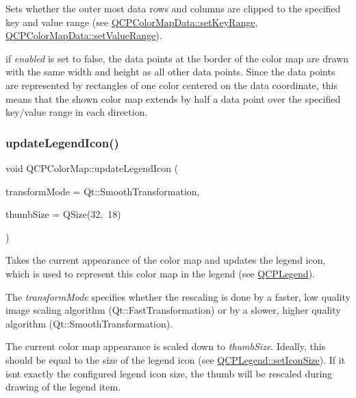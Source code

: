 Sets whether the outer most data rows and columns are clipped to the specified key and value range (see \hyperlink{class_q_c_p_color_map_data_a0738c485f3c9df9ea1241b7a8bb6a86e}{Q\+C\+P\+Color\+Map\+Data\+::set\+Key\+Range}, \hyperlink{class_q_c_p_color_map_data_ada1b2680ba96a5f4175b6d341cf75d23}{Q\+C\+P\+Color\+Map\+Data\+::set\+Value\+Range}).

if {\itshape enabled} is set to false, the data points at the border of the color map are drawn with the same width and height as all other data points. Since the data points are represented by rectangles of one color centered on the data coordinate, this means that the shown color map extends by half a data point over the specified key/value range in each direction.

\mbox{\label{class_q_c_p_color_map_a5d8158b62d55fcfeaabcb68ce0083e87}} 
\subsubsection{\texorpdfstring{update\+Legend\+Icon()}{updateLegendIcon()}}
{\footnotesize\ttfamily void Q\+C\+P\+Color\+Map\+::update\+Legend\+Icon (\begin{DoxyParamCaption}\item[{Qt\+::\+Transformation\+Mode}]{transform\+Mode = {\ttfamily Qt\+:\+:SmoothTransformation},  }\item[{const Q\+Size \&}]{thumb\+Size = {\ttfamily QSize(32,~18)} }\end{DoxyParamCaption})}

Takes the current appearance of the color map and updates the legend icon, which is used to represent this color map in the legend (see \hyperlink{class_q_c_p_legend}{Q\+C\+P\+Legend}).

The {\itshape transform\+Mode} specifies whether the rescaling is done by a faster, low quality image scaling algorithm (Qt\+::\+Fast\+Transformation) or by a slower, higher quality algorithm (Qt\+::\+Smooth\+Transformation).

The current color map appearance is scaled down to {\itshape thumb\+Size}. Ideally, this should be equal to the size of the legend icon (see \hyperlink{class_q_c_p_legend_a8b0740cce488bf7010da6beda6898984}{Q\+C\+P\+Legend\+::set\+Icon\+Size}). If it isn\textquotesingle{}t exactly the configured legend icon size, the thumb will be rescaled during drawing of the legend item.

